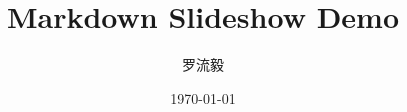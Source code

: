 \title{Markdown Slideshow Demo}
\subtitle{}
\author{罗流毅}
\date{\today}
\def\website{https://github.com/xluoly}
